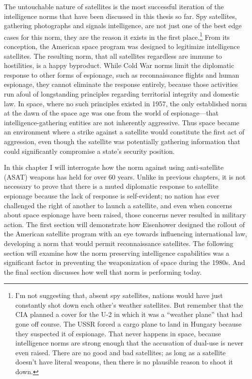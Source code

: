 \documentclass{report}
\begin{document}
The untouchable nature of satellites is the most successful iteration of the intelligence norms that have been discussed in this thesis so far. Spy satellites, gathering photographs and signals intelligence, are not just one of the best edge cases for this norm, they are the reason it exists in the first place.\footnote{I'm not suggesting that, absent spy satellites, nations would have just constantly shot down each other's weather satellites. But remember that the CIA planned a cover for the U-2 in which it was a ``weather plane'' that had gone off course. The USSR forced a cargo plane to land in Hungary because they suspected it of espionage. That never happens in space, because intelligence norms are strong enough that the accusation of dual-use is never even raised. There are no good and bad satellites; as long as a satellite doesn't have literal weapons, then there is no plausible reason to shoot it down.} From its conception, the American space program was designed to legitimize intelligence satellites. The resulting norm, that all satellites regardless are immune to hostilities, is a happy byproduct. While Cold War norms limit the diplomatic response to other forms of espionage, such as reconnaissance flights and human espionage, they cannot eliminate the response entirely, because those activities run afoul of longstanding principles regarding territorial integrity and domestic law. In space, where no such principles existed in 1957, the only established norm at the dawn of the space age was one from the world of espionage---that intelligence-gathering entities are not inherently aggressive. Thus space became an environment where a strike against a satellite would constitute the first act of aggression, even though the satellite was potentially gathering information that could significantly compromise a state's security position.

In this chapter I will interrogate how the norm against using anti-satellite (ASAT) weapons has held for over 60 years. Unlike in previous chapters, it is not necessary to prove that there is a muted diplomatic response to satellite espionage because the lack of response is self-evident; no nation has ever challenged the right of another to launch a satellite, and even when concerns about space espionage have been raised, those concerns never resulted in military action. The first section will demonstrate how Eisenhower designed the rollout of the American satellite program with an eye towards influencing international law, developing a norm that would permit reconnaissance satellites. The following section will examine how the norm preserving intelligence capabilities was a significant factor in preventing the weaponization of space during the 1980s. And the final section discusses how well that norm is performing today.
\end{document}
